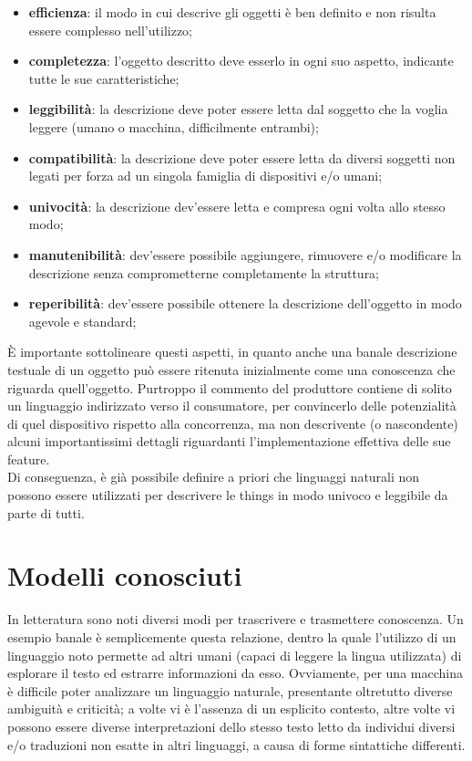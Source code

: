 \documentclass[12pt,a4paper,openright,oneside]{report}
\begin{document}
\begin{itemize}
	\item \textbf{efficienza}: il modo in cui descrive gli oggetti è ben definito e non risulta essere complesso nell'utilizzo;
	\item \textbf{completezza}: l'oggetto descritto deve esserlo in ogni suo aspetto, indicante tutte le sue caratteristiche;
	\item \textbf{leggibilità}: la descrizione deve poter essere letta dal soggetto che la voglia leggere (umano o macchina, difficilmente entrambi);
	\item \textbf{compatibilità}: la descrizione deve poter essere letta da diversi soggetti non legati per forza ad un singola famiglia di dispositivi e/o umani;
	\item \textbf{univocità}: la descrizione dev'essere letta e compresa ogni volta allo stesso modo;
	\item \textbf{manutenibilità}: dev'essere possibile aggiungere, rimuovere e/o modificare la descrizione senza comprometterne completamente la struttura;
	\item \textbf{reperibilità}: dev'essere possibile ottenere la descrizione dell'oggetto in modo agevole e standard;
\end{itemize}

È importante sottolineare questi aspetti, in quanto anche una banale descrizione testuale di un oggetto può essere ritenuta inizialmente come una conoscenza che riguarda quell'oggetto. Purtroppo il commento del produttore contiene di solito un linguaggio indirizzato verso il consumatore, per convincerlo delle potenzialità di quel dispositivo rispetto alla concorrenza, ma non descrivente (o nascondente) alcuni importantissimi dettagli riguardanti l'implementazione effettiva delle sue feature.\\

Di conseguenza, è già possibile definire a priori che linguaggi naturali non possono essere utilizzati per descrivere le things in modo univoco e leggibile da parte di tutti.

\section{Modelli conosciuti}
In letteratura sono noti diversi modi per trascrivere e trasmettere conoscenza. Un esempio banale è semplicemente questa relazione, dentro la quale l'utilizzo di un linguaggio noto permette ad altri umani (capaci di leggere la lingua utilizzata) di esplorare il testo ed estrarre informazioni da esso. Ovviamente, per una macchina è difficile poter analizzare un linguaggio naturale, presentante oltretutto diverse ambiguità e criticità; a volte vi è l'assenza di un esplicito contesto, altre volte vi possono essere diverse interpretazioni dello stesso testo letto da individui diversi e/o traduzioni non esatte in altri linguaggi, a causa di forme sintattiche differenti.\\
\end{document}
